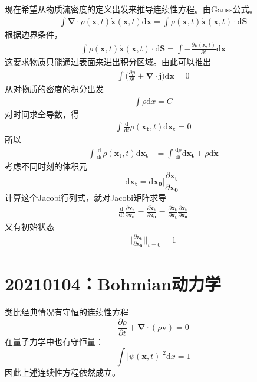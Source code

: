 \documentclass[12pt]{article}
\begin{document}
现在希望从物质流密度的定义出发来推导连续性方程。由Gauss公式。
\begin{align*}
    \int \bm{\nabla} \cdot \rho(\bm{x},t) \bm{\dot{x}}(\bm{x},t) \mathrm{d}\bm{x} = \int \rho(\bm{x},t) \bm{\dot{x}}(\bm{x},t) \cdot \mathrm{d}\bm{S}
\end{align*}
根据边界条件，
\begin{align*}
    \int \rho(\bm{x},t) \bm{\dot{x}}(\bm{x},t) \cdot \mathrm{d}\bm{S} = \int -\frac {\partial \rho(\bm{x},t)}{\partial t} \mathrm{d}\bm{x}
\end{align*}
这要求物质只能通过表面来进出积分区域。由此可以推出
\begin{align*}
    \int \bigg(\frac {\partial \rho}{\partial t} + \bm{\nabla \cdot j}\bigg) \mathrm{d}\bm{x} = 0 
\end{align*}
从对物质的密度的积分出发
\begin{align*}
    \int \rho \mathrm{d}x = C
\end{align*}
对时间求全导数，得
\begin{align*}
    \int \frac {\mathrm{d}}{\mathrm{d}t}\rho(\bm{x_t},t)\mathrm{d}\bm{x_t} = 0
\end{align*}
所以
\begin{align*}
   \int \frac {\mathrm{d}}{\mathrm{d}t}\rho(\bm{x_t},t)\mathrm{d}\bm{x_t} &= \int \frac {\mathrm{d}\rho}{\mathrm{d}t}\mathrm{d}\bm{x_t} + \rho \mathrm{d}\bm{\dot{x}}
\end{align*}
考虑不同时刻的体积元
\begin{equation*}
    \mathrm{d}\bm{x_t} = \mathrm{d}\bm{x_0} \bigg|\frac {\partial \bm{x_t}}{\partial \bm{x_0}}\bigg|
\end{equation*}
计算这个Jacobi行列式，就对Jacobi矩阵求导
\begin{align*}
    \frac {\mathrm{d}}{\mathrm{d}t} \frac {\partial \bm{x_t}}{\partial \bm{x_0}} = \frac {\partial \bm{\dot{x}_t}}{\partial \bm{x_0}} = \frac {\partial \bm{\dot{x}_t}}{\partial \bm{x_t}} \frac {\partial \bm{x_t}}{\partial \bm{x_0}}
\end{align*}
又有初始状态
\begin{align*}
    \bigg|\frac {\partial \bm{x_t}}{\partial \bm{x_0}} \bigg|\Bigg|_{t=0} = 1
\end{align*}

\section{20210104：Bohmian动力学}

类比经典情况有守恒的连续性方程
\begin{equation*}
    \frac {\partial \rho}{\partial t} + \bm{\nabla} \cdot (\rho \bm{v}) = 0
\end{equation*}
在量子力学中也有守恒量：
\begin{equation*}
    \int |\psi(\bm{x},t)|^2 \mathrm{d}x = 1
\end{equation*}
因此上述连续性方程依然成立。
\end{document}
